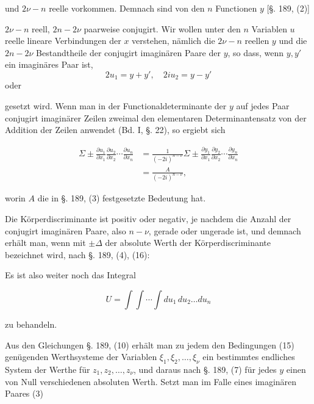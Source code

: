 und $2\nu - n$ reelle vorkommen. Demnach sind von den $n$ Functionen $y$ [§. 189, (2)]


$2\nu - n$ reell, $2n-2\nu$ paarweise conjugirt. Wir wollen unter den $n$ Variablen $u$ reelle lineare Verbindungen der $x$ verstehen, nämlich die $2\nu-n$ reellen $y$ und die $2n-2\nu$ Bestandtheile der conjugirt imaginären Paare der $y$, so dass, wenn $y, y'$ ein imaginäres Paar ist,
\[
2u_1 = y+y', \quad 2iu_2 = y-y'
\]
oder


gesetzt wird. Wenn man in der Functionaldeterminante der $y$ auf jedes Paar conjugirt imaginärer Zeilen zweimal den elementaren Determinantensatz von der Addition der Zeilen anwendet (Bd. I, §. 22), so ergiebt sich

\[
\begin{aligned}
\Sigma \pm \frac{\partial u_1}{\partial x_1}\frac{\partial u_2}{\partial x_2}\cdots\frac{\partial u_n}{\partial x_n}
&= \frac{1}{(-2i)^{n-\nu}}\Sigma\pm\frac{\partial y_1}{\partial x_1}\frac{\partial y_2}{\partial x_2}\cdots\frac{\partial y_n}{\partial x_n} \\
&= \frac{A}{(-2i)^{n-\nu}},
\end{aligned}
\]

worin $A$ die in §. 189, (3) festgesetzte Bedeutung hat.

Die Körperdiscriminante ist positiv oder negativ, je nachdem die Anzahl der conjugirt imaginären Paare, also $n-\nu$, gerade oder ungerade ist, und demnach erhält man, wenn mit $\pm\varDelta$ der absolute Werth der Körperdiscriminante bezeichnet wird, nach §. 189, (4), (16):


Es ist also weiter noch das Integral

\[
U = \int\int\cdots\int du_1\,du_2\ldots du_n
\]

zu behandeln.

Aus den Gleichungen §. 189, (10) erhält man zu jedem den Bedingungen (15) genügenden Werthsysteme der Variablen $\xi_1, \xi_2, \ldots, \xi_\nu$ ein bestimmtes endliches System der Werthe für $z_1, z_2, \ldots, z_\nu$, und daraus nach §. 189, (7) für jedes $y$ einen von Null verschiedenen absoluten Werth. Setzt man im Falle eines imaginären Paares (3)


